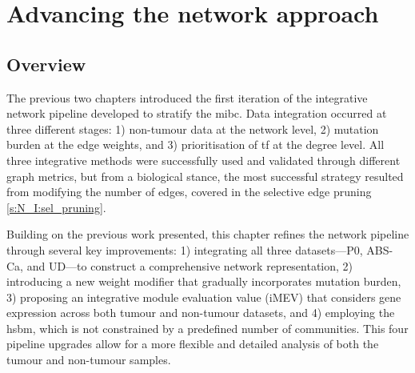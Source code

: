 
\chapter{Advancing the network approach} \label{s:N_II}


\vspace{3mm}
\vspace{3mm}


\section{Overview}

The previous two chapters introduced the first iteration of the integrative network pipeline developed to stratify the \acrfull{mibc}. Data integration occurred at three different stages: 1) non-tumour data at the network level, 2) mutation burden at the edge weights, and 3) prioritisation of \acrfull{tf} at the degree level. All three integrative methods were successfully used and validated through different graph metrics, but from a biological stance, the most successful strategy resulted from modifying the number of edges, covered in the selective edge pruning \cref{s:N_I:sel_pruning}.


Building on the previous work presented, this chapter refines the network pipeline through several key improvements: 1) integrating all three datasets—P0, ABS-Ca, and UD—to construct a comprehensive network representation, 2) introducing a new weight modifier that gradually incorporates mutation burden, 3) proposing an integrative module evaluation value (iMEV) that considers gene expression across both tumour and non-tumour datasets, and 4) employing the \acrfull{hsbm}, which is not constrained by a predefined number of communities. This four pipeline upgrades allow for a more flexible and detailed analysis of both the tumour and non-tumour samples.


